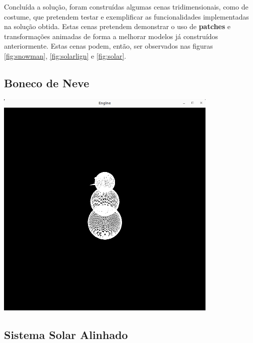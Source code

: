 Concluída a solução, foram construídas algumas cenas
tridimensionais, como de costume, que pretendem testar e exemplificar as funcionalidades
implementadas na solução obtida.
\newline
\break
\noindent
Estas cenas pretendem demonstrar o uso de \textbf{patches}
e transformações animadas de forma a melhorar modelos já construídos anteriormente.
\newline
\break
\noindent
Estas cenas podem, então, ser observados nas figuras
\ref{fig:snowman}, \ref{fig:solarlign} e \ref{fig:solar}.

\subsection{Boneco de Neve}

\begin{center}
    \includegraphics[width=0.8\textwidth]{imgs/boneconeve.png}
    \label{fig:snowman}
\end{center}

\subsection{Sistema Solar Alinhado}

